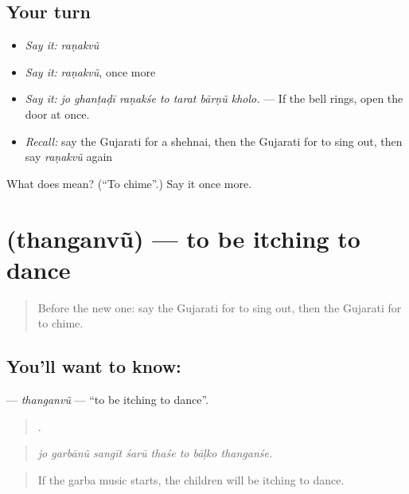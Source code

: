 \subsection*{Your turn}
\begin{itemize}
\raggedright
  \item \emph{Say it:} \emph{raṇakvũ}
  \item \emph{Say it:} \emph{raṇakvũ}, once more
  \item \emph{Say it:} \emph{jo ghanṭaḍī raṇakśe to tarat bārṇũ kholo.} — If the bell rings, open the door at once.
  \item \emph{Recall:} say the Gujarati for a shehnai, then the Gujarati for to sing out, then say \emph{raṇakvũ} again
\end{itemize}

\begin{tcolorbox}[breakable,colback=teal!4,colframe=teal!35!black,title={Before you move on}]
What does  mean? (\textquotedblleft{}To chime\textquotedblright{}.) Say it once more.
\end{tcolorbox}
\section[\texorpdfstring{\gu{થનગનવું} (thanganvũ)}{થનગનવું (thanganvũ)}]{ (thanganvũ) — to be itching to dance}

\label{lesson:GU-C553-thanganvu}



\begin{quote}
Before the new one: say the Gujarati for to sing out, then the Gujarati for to chime.
\end{quote}

\subsection*{You'll want to know: }
\textbf{} — \emph{thanganvũ} — \textquotedblleft{}to be itching to dance\textquotedblright{}.

\begin{quote}
       .
\end{quote}

\begin{quote}
\emph{jo garbānũ sangīt śarū thaśe to bāḷko thanganśe.}
\end{quote}

\begin{quote}
If the garba music starts, the children will be itching to dance.
\end{quote}

